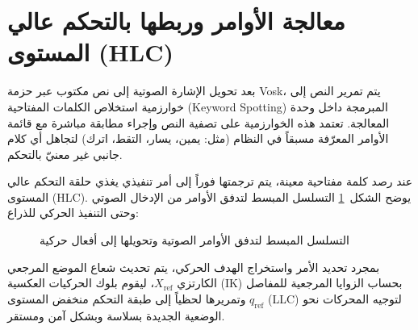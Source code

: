 \section{معالجة الأوامر وربطها بالتحكم عالي المستوى (\textenglish{HLC})}
بعد تحويل الإشارة الصوتية إلى نص مكتوب عبر حزمة \textenglish{Vosk}، يتم تمرير النص إلى خوارزمية استخلاص الكلمات المفتاحية (\textenglish{Keyword Spotting}) المبرمجة داخل وحدة المعالجة. تعتمد هذه الخوارزمية على تصفية النص وإجراء مطابقة مباشرة مع قائمة الأوامر المعرّفة مسبقاً في النظام (مثل: يمين، يسار، التقط، اترك) لتجاهل أي كلام جانبي غير معنيّ بالتحكم.

عند رصد كلمة مفتاحية معينة، يتم ترجمتها فوراً إلى أمر تنفيذي يغذي حلقة التحكم عالي المستوى (\textenglish{HLC}). يوضح الشكل~\ref{fig:voice_command_diagram} التسلسل المبسط لتدفق الأوامر من الإدخال الصوتي وحتى التنفيذ الحركي للذراع:

\begin{figure}[H]
    \centering
    \caption{التسلسل المبسط لتدفق الأوامر الصوتية وتحويلها إلى أفعال حركية}
    \label{fig:voice_command_diagram}
\end{figure}

بمجرد تحديد الأمر واستخراج الهدف الحركي، يتم تحديث شعاع الموضع المرجعي الكارتزي $X_{\text{ref}}$، ليقوم بلوك الحركيات العكسية (\textenglish{IK}) بحساب الزوايا المرجعية للمفاصل $q_{\text{ref}}$ وتمريرها لحظياً إلى طبقة التحكم منخفض المستوى (\textenglish{LLC}) لتوجيه المحركات نحو الوضعية الجديدة بسلاسة وبشكل آمن ومستقر.